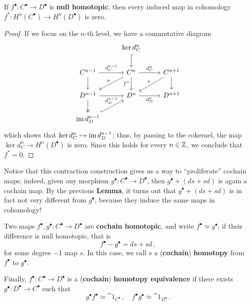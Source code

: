 \begin{lemma}
    If $f^{\bullet}:C^{\bullet} \to D^{\bullet}$
    is \textbf{null homotopic}, then every induced map
    in cohomology 
    $f^{*}:H^{n}(C^{\bullet}) \to H^{n}(D^{\bullet})$
    is zero.
    \begin{proof}
        If we focus on the $n$-th level, 
        we have a commutative diagram
        \begin{equation*}
            \begin{tikzcd}
                & \ker d^{n}_{C} \ar[d, hook] & \\
                C^{n-1} \ar[r, "d^{n-1}_{C}"] \ar[d]
                & C^{n} \ar[r, "d^{n}_{C}"] \ar[d, "f^{n}"'] \ar[dl, "s"']
                & C^{n+1} \ar[d] \ar[dl, "s"'] \\
                D^{n-1} \ar[r, "d^{n-1}_{D}"'] \ar[d, two heads]
                & D^{n} \ar[r, "d^{n}_{D}"']
                & D^{n+1} \\
                \im d^{n-1}_{D} \ar[ru, hook] & &
            \end{tikzcd}
        \end{equation*}
        which shows that $\ker d^{n}_{C} \hookrightarrow \operatorname{im} d^{n-1}_{D}$;
        thus, by passing to the cokernel, 
        the map $\ker d^{n}_{C} \to H^{n}(D^{\bullet})$ is zero.
        Since this holds for every $n \in {\mathbb Z}$, we conclude that $f^{*} = 0$.
    \end{proof}
\end{lemma}

Notice that this contraction construction gives
us a way to ``proliferate'' cochain maps:
indeed, given any morphism $g^{\bullet}: C^{\bullet} \to D^{\bullet}$,
then $g^{\bullet} + (ds+sd)$ is again a cochain map.
By the previous \textbf{Lemma}, 
it turns out that $g^{\bullet} + (ds+sd)$ is in fact
not very different from $g^{\bullet}$,
because they induce the same maps in cohomology!

\begin{df}
    Two maps $f^{\bullet}, g^{\bullet}: C^{\bullet} \to D^{\bullet}$
    are \textbf{cochain homotopic}, 
    and write $f^{\bullet} \simeq g^{\bullet}$,
    if their difference is null homotopic, that is
    \begin{equation*}
        f^{\bullet} - g^{\bullet} = ds + sd\,,
    \end{equation*}
    for some degree $-1$ map $s$. In this case,
    we call $s$ a (\textbf{cochain}) \textbf{homotopy}
    from $f^{\bullet}$ to $g^{\bullet}$.

    Finally, $f^{\bullet}: C^{\bullet} \to D^{\bullet}$
    is a (\textbf{cochain}) \textbf{homotopy equivalence}
    if there exists $g^{\bullet} : D^{\bullet} \to C^{\bullet}$
    such that
    \begin{equation*}
        g^{\bullet}f^{\bullet} \simeq \cat{1}_{C^{\bullet}}\,,
        \quad f^{\bullet}g^{\bullet} \simeq \cat{1}_{D^{\bullet}}\,.
    \end{equation*}
\end{df}

